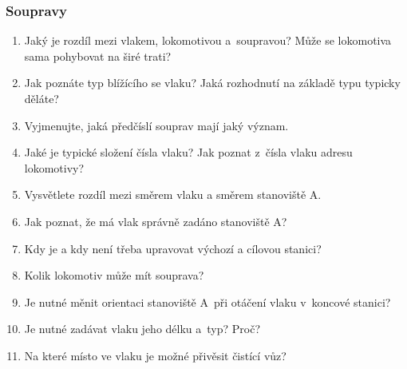 \documentclass[12pt,a4paper]{article}
\begin{document}
\subsubsection*{Soupravy}
\begin{enumerate}[leftmargin=*]
\item Jaký je rozdíl mezi vlakem, lokomotivou a~soupravou? Může se lokomotiva
sama pohybovat na širé trati?
\item Jak poznáte typ blížícího se vlaku? Jaká rozhodnutí na základě typu
typicky děláte?
\item Vyjmenujte, jaká předčíslí souprav mají jaký význam.
\item Jaké je typické složení čísla vlaku? Jak poznat z~čísla vlaku adresu
lokomotivy?
\item Vysvětlete rozdíl mezi směrem vlaku a směrem stanoviště A.
\item Jak poznat, že má vlak správně zadáno stanoviště A?
\item Kdy je a kdy není třeba upravovat výchozí a cílovou stanici?
\item Kolik lokomotiv může mít souprava?
\item Je nutné měnit orientaci stanoviště A~při otáčení vlaku v~koncové
stanici?
\item Je nutné zadávat vlaku jeho délku a~typ? Proč?
\item Na které místo ve vlaku je možné přivěsit čistící vůz?
\end{enumerate}
\end{document}
